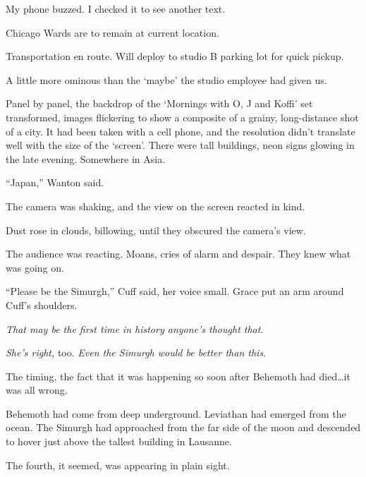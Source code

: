My phone buzzed.  I checked it to see another text.



Chicago Wards are to remain at current location.



Transportation en route.  Will deploy to studio B parking lot for quick pickup.



A little more ominous than the `maybe' the studio employee had given us.



Panel by panel, the backdrop of the `Mornings with O, J and Koffi' set transformed, images flickering to show a composite of a grainy, long-distance shot of a city.  It had been taken with a cell phone, and the resolution didn't translate well with the size of the `screen'.  There were tall buildings, neon signs glowing in the late evening.  Somewhere in Asia.



``Japan,'' Wanton said.



The camera was shaking, and the view on the screen reacted in kind.



Dust rose in clouds, billowing, until they obscured the camera's view.



The audience was reacting.  Moans, cries of alarm and despair.  They knew what was going on.



``Please be the Simurgh,'' Cuff said, her voice small.  Grace put an arm around Cuff's shoulders.



\emph{That may be the first time in history anyone's thought that}.



\emph{She's right,} too.\emph{  Even the Simurgh would be better than this}.



The timing, the fact that it was happening so soon after Behemoth had died\ldots it was all wrong.



Behemoth had come from deep underground.  Leviathan had emerged from the ocean.  The Simurgh had approached from the far side of the moon and descended to hover just above the tallest building in Lausanne.



The fourth, it seemed, was appearing in plain sight.




